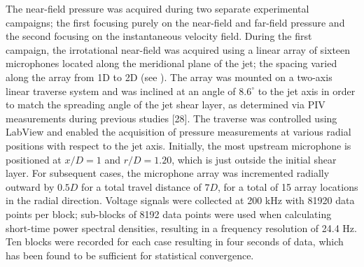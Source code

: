 The near-field pressure was acquired  during two separate experimental campaigns; the first focusing purely on the near-field and far-field pressure and the second focusing on the instantaneous velocity field. During the first campaign, the irrotational near-field was acquired using a linear array of sixteen microphones located along the meridional plane of the jet; the spacing varied along the array from 1D to 2D (see ). 
The array was mounted on a two-axis linear traverse system and was inclined at an angle of $8.6^\circ$ to the jet axis in order to match the spreading angle of the jet shear layer, as determined via PIV measurements during previous studies [28]. 
The traverse was controlled using LabView and enabled the acquisition of pressure measurements at various radial positions with respect to the jet axis. 
Initially, the most upstream microphone is positioned at $x/D = 1$ and $r/D = 1.20$, which is just outside the initial shear layer.
For subsequent cases, the microphone array was incremented radially outward by $0.5D$ for a total travel distance of $7D$, for a total of 15 array locations in the radial direction.
Voltage signals were collected at 200 kHz with 81920 data points per block; sub-blocks of 8192 data points were used when calculating short-time power spectral densities, resulting in a frequency resolution of 24.4 Hz. 
Ten blocks were recorded for each case resulting in four seconds of data, which has been found to be sufficient for statistical convergence.
